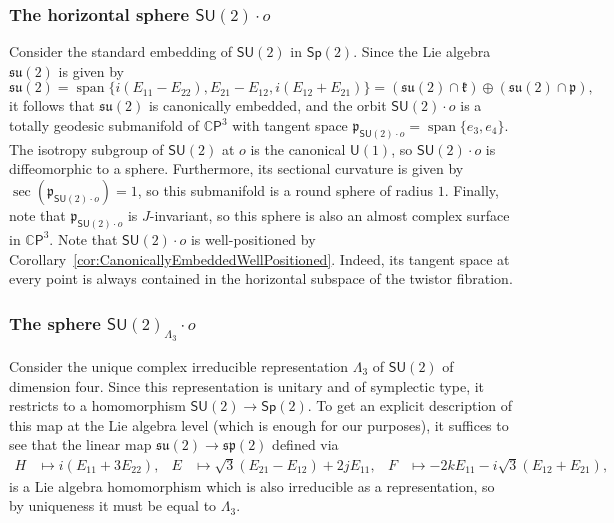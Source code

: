 \documentclass[11pt,a4paper,final]{amsart}
\newcommand{\s}{\mathsf}
\newcommand{\g}{\mathfrak}
\newcommand{\C}{\mathbb{C}}
\newcommand{\vecspan}{\operatorname{span}}
\theoremstyle{definition}
\begin{document}
\subsubsection{The horizontal sphere $\mathsf{SU}(2)\cdot o$}
	
Consider the standard embedding of $\mathsf{SU}(2)$ in $\mathsf{Sp}(2)$.
Since the Lie algebra $\g{su}(2)$ is given by
\begin{equation*}
	\g{su}(2)=\vecspan\bigl\{
		i(E_{11}-E_{22}),E_{21}-E_{12},i(E_{12}+E_{21})
	\bigr\}
	=(\g{su}(2)\cap\g{k})\oplus(\g{su}(2)\cap \g{p}),
\end{equation*}
it follows that $\g{su}(2)$ is canonically embedded, and the orbit $\mathsf{SU}(2)\cdot o$ is a totally geodesic submanifold of $\C\mathsf{P}^{3}$ with tangent space $\g{p}_{\mathsf{SU}(2)\cdot o}=\vecspan\{e_{3},e_{4}\}$.
The isotropy subgroup of $\mathsf{SU}(2)$ at $o$ is the canonical $\mathsf{U}(1)$, so $\mathsf{SU}(2)\cdot o$ is diffeomorphic to a sphere.
Furthermore, its sectional curvature is given by $\operatorname{sec}(\g{p}_{\mathsf{SU}(2)\cdot o})=1$, so this submanifold is a round sphere of radius $1$.
Finally, note that $\g{p}_{\mathsf{SU}(2)\cdot o}$ is $J$-invariant, so this sphere is also an almost complex surface in $\C\mathsf{P}^{3}$.
Note that $\s{SU}(2)\cdot o$ is well-positioned by Corollary~\ref{cor:CanonicallyEmbeddedWellPositioned}.
Indeed, its tangent space at every point is always contained in the horizontal subspace of the twistor fibration.
	
\subsubsection{The sphere $\mathsf{SU}(2)_{\Lambda_{3}}\cdot o$}
	
Consider the unique complex irreducible representation $\Lambda_{3}$ of $\mathsf{SU}(2)$ of dimension four.
Since this representation is unitary and of symplectic type, it restricts to a homomorphism $\mathsf{SU}(2)\to\mathsf{Sp}(2)$.
To get an explicit description of this map at the Lie algebra level (which is enough for our purposes), it suffices to see that the linear map $\g{su}(2)\to \g{sp}(2)$ defined via
\begin{equation*}
	\begin{aligned}
		H&\mapsto i(E_{11}+3E_{22}), & E&\mapsto\sqrt{3}(E_{21}-E_{12})+2jE_{11} ,& F&\mapsto -2kE_{11}-i\sqrt{3}(E_{12}+E_{21}),
	\end{aligned}
\end{equation*}
is a Lie algebra homomorphism which is also irreducible as a representation, so by uniqueness it must be equal to $\Lambda_3$.
\end{document}
